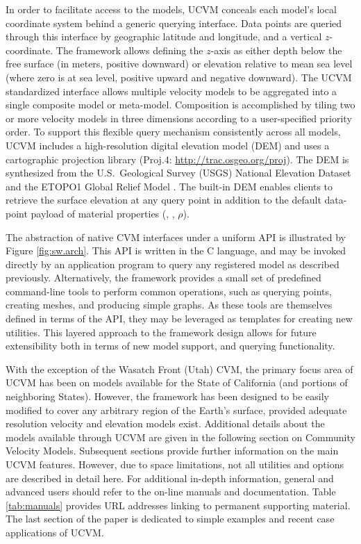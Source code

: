 In order to facilitate access to the models, UCVM conceals each model's local coordinate system behind a generic querying interface. Data points are queried through this interface by geographic latitude and longitude, and a vertical $z$-coordinate. The framework allows defining the $z$-axis as either depth below the free surface (in meters, positive downward) or elevation relative to mean sea level (where zero is at sea level, positive upward and negative downward). The UCVM standardized interface allows multiple velocity models to be aggregated into a single composite model or meta-model. Composition is accomplished by tiling two or more velocity models in three dimensions according to a user-specified priority order. To support this flexible query mechanism consistently across all models, UCVM includes a high-resolution digital elevation model (DEM) and uses a cartographic projection library (Proj.4: \url{http://trac.osgeo.org/proj}). The DEM is synthesized from the U.S.~Geological Survey (USGS) National Elevation Dataset \citep{Gesch_2002_PERS, Gesch_2007_Chap} and the ETOPO1 Global Relief Model \citep{Amante_2009_Manual}. The built-in DEM enables clients to retrieve the surface elevation at any query point in addition to the default data-point payload of material properties (\vp{}, \vs{}, $\rho$).

The abstraction of native CVM interfaces under a uniform API is illustrated by Figure \ref{fig:sw.arch}. This API is written in the C language, and may be invoked directly by an application program to query any registered model as described previously. Alternatively, the framework provides a small set of predefined command-line tools to perform common operations, such as querying points, creating meshes, and producing simple graphs. As these tools are themselves defined in terms of the API, they may be leveraged as templates for creating new utilities. This layered approach to the framework design allows for future extensibility both in terms of new model support, and querying functionality.

With the exception of the Wasatch Front (Utah) CVM, the primary focus area of UCVM has been on models available for the State of California (and portions of neighboring States). However, the framework has been designed to be easily modified to cover any arbitrary region of the Earth's surface, provided adequate resolution velocity and elevation models exist. Additional details about the models available through UCVM are given in the following section on Community Velocity Models. Subsequent sections provide further information on the main UCVM features. However, due to space limitations, not all utilities and options are described in detail here. For additional in-depth information, general and advanced users should refer to the on-line manuals and documentation. Table \ref{tab:manuals} provides URL addresses linking to permanent supporting material. The last section of the paper is dedicated to simple examples and recent case applications of UCVM. 




